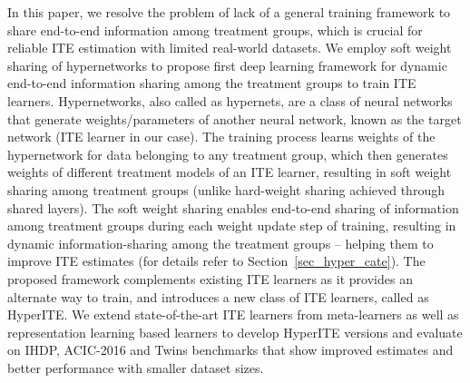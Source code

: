 \documentclass{article}
\begin{document}
In this paper, we resolve the problem of lack of a general training framework to share end-to-end information among treatment groups, which is crucial for reliable ITE estimation with limited real-world datasets. We employ soft weight sharing of hypernetworks \cite{ha2017hypernetworks} to propose first deep learning framework for dynamic end-to-end information sharing among the treatment groups to train ITE learners. Hypernetworks, also called as hypernets, are a class of neural networks that generate weights/parameters of another neural network, known as the target network (ITE learner in our case). The training process learns weights of the hypernetwork for data belonging to any treatment group, which then generates weights of different treatment models of an ITE learner, resulting in soft weight sharing among treatment groups (unlike hard-weight sharing achieved through shared layers). The soft weight sharing enables end-to-end sharing of information among treatment groups during each weight update step of training, resulting in dynamic information-sharing among the treatment groups -- helping them to improve ITE estimates (for details refer to Section~\ref{sec_hyper_cate}).
The proposed framework complements existing ITE learners as it provides an alternate way to train, and introduces a new class of ITE learners, called as HyperITE.
We extend state-of-the-art ITE learners from meta-learners as well as representation learning based learners to develop HyperITE versions and evaluate on IHDP, ACIC-2016 and Twins benchmarks that show improved estimates and better performance with smaller dataset sizes.
\end{document}
